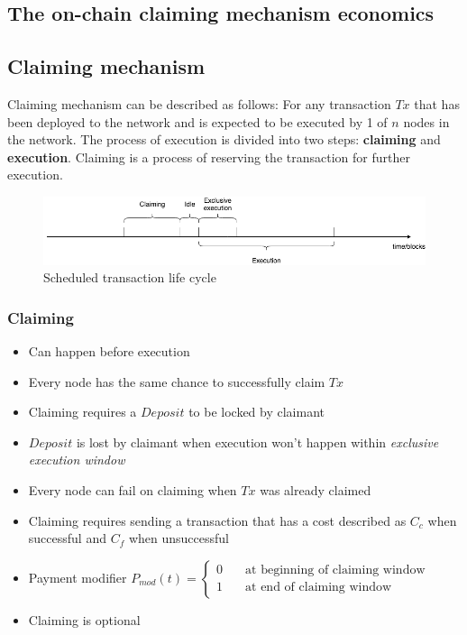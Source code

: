 \documentclass{report}
\begin{document}
  \begin{appendices}
    \chapter{The on-chain claiming mechanism economics}\label{appendix}
    \section{Claiming mechanism}
  Claiming mechanism can be described as follows:
  For any transaction $Tx$ that has been deployed to the network and is expected to be executed by 1 of $n$ nodes in the network. The process of execution is divided into two steps:
  \textbf{claiming} and \textbf{execution}. Claiming is a process of reserving the transaction for further execution.
  \begin{figure}
    \includegraphics[width=\linewidth]{claiming/timeranges.png}
    \caption{Scheduled transaction life cycle}
    \label{fig:boat1}
  \end{figure}

  \subsection{Claiming}
  \begin{itemize}
  \item Can happen before execution
  \item Every node has the same chance to successfully claim $Tx$
  \item Claiming requires a $Deposit$ to be locked by claimant
  \item $Deposit$ is lost by claimant when execution won't happen within \textit{exclusive execution window}
  \item Every node can fail on claiming when $Tx$ was already claimed
  \item Claiming requires sending a transaction that has a cost described as $C_{c}$ when successful and $C_{f}$ when unsuccessful
  \item Payment modifier $P_{mod}(t)=\begin{cases}
  0 & \quad \text{at beginning of claiming window}\\
  1 & \quad \text{at end of claiming window}
  \end{cases}$
  \item Claiming is optional
  \end{itemize}


\end{appendices}
\end{document}
